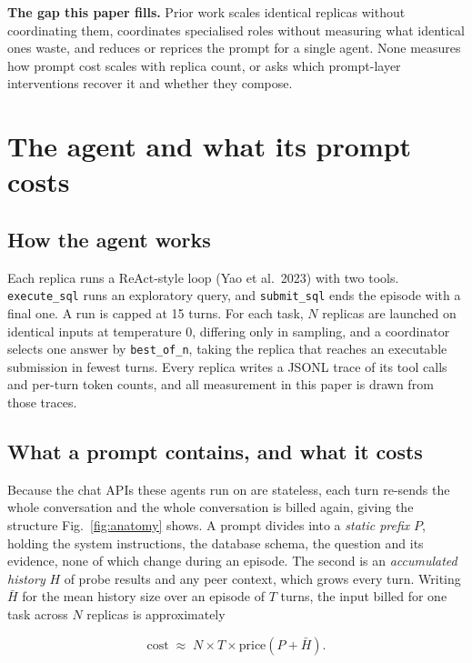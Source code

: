 \documentclass[conference]{IEEEtran}
\begin{document}
\textbf{The gap this paper fills.} Prior work scales identical replicas without coordinating
them, coordinates specialised roles without measuring what identical ones waste,
and reduces or reprices the prompt for a single agent. None measures how prompt
cost scales with replica count, or asks which prompt-layer interventions recover
it and whether they compose.

\section{The agent and what its prompt costs}\label{sec:system}

\subsection{How the agent works}\label{sec:harness}

Each replica runs a ReAct-style loop (Yao et al.~2023) with two tools.
\texttt{execute\_sql} runs an exploratory query, and \texttt{submit\_sql} ends
the episode with a final one. A run is capped at 15 turns. For each task, $N$
replicas are launched on identical inputs at temperature 0, differing only in
sampling, and a coordinator selects one answer by \texttt{best\_of\_n}, taking
the replica that reaches an executable submission in fewest turns. Every replica
writes a JSONL trace of its tool calls and per-turn token counts, and all
measurement in this paper is drawn from those traces.

\subsection{What a prompt contains, and what it costs}\label{sec:costmodel}

Because the chat APIs these agents run on are stateless, each turn re-sends the
whole conversation and the whole conversation is billed again, giving the
structure Fig.~\ref{fig:anatomy} shows. A prompt divides into a
\emph{static prefix} $P$, holding the system instructions, the database schema,
the question and its evidence, none of which change during an episode. The
second is an \emph{accumulated history} $H$ of probe results and any peer
context, which grows every turn. Writing $\bar{H}$ for the mean history size over an episode of
$T$ turns, the input billed for one task across $N$ replicas is approximately

\begin{equation}\label{eq:cost}
\mathrm{cost} \;\approx\; N \times T \times \mathrm{price}\!\left(P + \bar{H}\right).
\end{equation}
\end{document}
